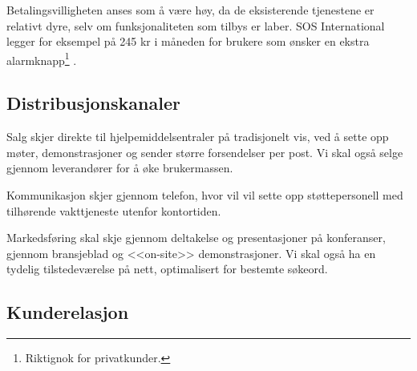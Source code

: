 Betalingsvilligheten anses som å være høy, da de eksisterende tjenestene er
relativt dyre, selv om funksjonaliteten som tilbys er laber.  SOS International
legger for eksempel på 245 kr i måneden for brukere som ønsker en ekstra
alarmknapp\footnote{Riktignok for privatkunder.} \cite{sos.int}.

\subsection{Distribusjonskanaler}



Salg skjer direkte til hjelpemiddelsentraler på tradisjonelt vis, ved å sette
opp møter, demonstrasjoner og sender større forsendelser per post. Vi skal også
selge gjennom leverandører for å øke brukermassen.

Kommunikasjon skjer gjennom telefon, hvor vil vil sette opp støttepersonell med
tilhørende vakttjeneste utenfor kontortiden.

Markedsføring skal skje gjennom deltakelse og presentasjoner på konferanser,
gjennom bransjeblad og <<on-site>> demonstrasjoner.  Vi skal også ha en tydelig
tilstedeværelse på nett, optimalisert for bestemte søkeord.

\subsection{Kunderelasjon}



